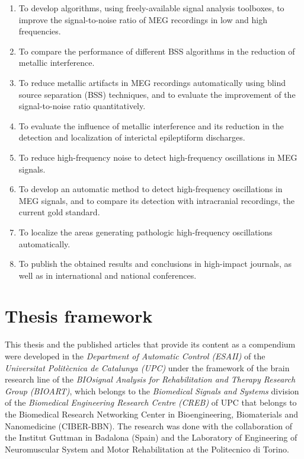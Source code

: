 \begin{enumerate}[I]

\item To develop algorithms, using freely-available signal analysis toolboxes, to improve the signal-to-noise ratio of MEG recordings in low and high frequencies. 
\item To compare the performance of different BSS algorithms in the reduction of metallic interference. 
\item To reduce metallic artifacts in MEG recordings automatically using blind source separation (BSS) techniques, and to evaluate the improvement of the signal-to-noise ratio quantitatively.
\item To evaluate the influence of metallic interference and its reduction in the detection and localization of interictal epileptiform discharges.
\item To reduce high-frequency noise to detect high-frequency oscillations in MEG signals.
\item To develop an automatic method to detect high-frequency oscillations in MEG signals, and to compare its detection with intracranial recordings, the current gold standard.
\item To localize the areas generating pathologic high-frequency oscillations automatically.
\item To publish the obtained results and conclusions in high-impact journals, as well as in international and national conferences.

\end{enumerate}

     \section{Thesis framework}
     
This thesis and the published articles that provide its content as a compendium were developed in the \emph{Department of Automatic Control (ESAII)} of the \emph{Universitat Polit\`{e}cnica de Catalunya (UPC)} under the framework of the brain research line of the \emph{BIOsignal Analysis for Rehabilitation and Therapy Research Group (BIOART)}, which belongs to the \emph{Biomedical Signals and Systems} division of the \emph{Biomedical Engineering Research Centre (CREB)} of UPC that belongs to the Biomedical Research Networking Center in Bioengineering, Biomaterials and Nanomedicine (CIBER-BBN). The research was done with the collaboration of the Institut Guttman in Badalona (Spain) and the Laboratory of Engineering of Neuromuscular System and Motor Rehabilitation at the Politecnico di Torino.

